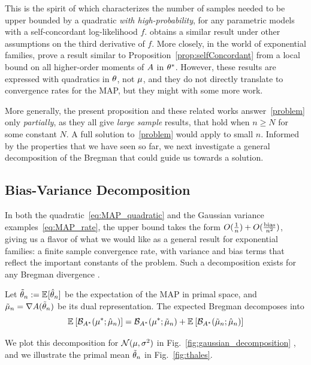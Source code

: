 This is the spirit of
\citet{ostrovskii2021finite} which characterizes the number of samples needed to be upper bounded by a quadratic \emph{with high-probability}, for any parametric models with a self-concordant log-likelihood $f$.
\citet{anastasiou2017bounds} obtains a similar result under other assumptions on the third derivative of $f$.
More closely, in the world of exponential families, \citet{kakade2010learning} prove a result similar to Proposition~\ref{prop:selfConcordant} from a local bound on all higher-order moments of $A$ in $\theta^*$.
However, these results are expressed with quadratics in $\theta$, not $\mu$, and they do not directly translate to convergence rates for the MAP, but they might with some more work.

More generally, the present proposition and these related works answer~\eqref{problem} only \emph{partially}, as they all give \textit{large sample} results, that hold when $n\geq N$ for some constant $N$. 
A full solution to~\eqref{problem} would apply to small $n$.
Informed by the properties that we have seen so far, we next investigate a general decomposition of the Bregman that could guide us towards a solution.


\subsection{Bias-Variance Decomposition}
\label{ssec:bias-variance}
In both the quadratic~\eqref{eq:MAP_quadratic} and the Gaussian variance examples~\eqref{eq:MAP_rate}, the upper bound takes the form $O(\frac{1}{n}) + O(\frac{\text{bias}}{n^2})$,
giving us a flavor of what we would like as a general result for exponential families: a finite sample convergence rate, with variance and bias terms that reflect the important constants of the problem.
Such a decomposition exists for any Bregman divergence \citep[Theorem 0.1]{pfau2013generalized}.
\begin{theorem}
	Let $\tilde \theta_n := \mathbb{E}_{} [ \hat \theta_n ] $ be the expectation of the MAP in primal space, and $\tilde {\mu}_n = \nabla A(\tilde \theta_n )$ be its dual representation. The  expected Bregman decomposes into
\begin{equation}
	\mathbb{E}_{} \left[ {\mathcal B}_{A^*}(\mu^* ; \hat {\mu}_n) \right]  = {{\mathcal B}_{A^*}(\mu^* ; \tilde {\mu}_n)}
	+ {\mathbb{E}_{} \left[ {\mathcal B}_{A^*}(\tilde {\mu}_n ; \hat {\mu}_n) \right] }
	\label{eq:bias-variance}
\end{equation}
\end{theorem}
We plot this decomposition for ${\mathcal N}(\mu, \sigma^2)$ in Fig.~\ref{fig:gaussian_decomposition} , and we illustrate the primal mean $\tilde {\theta}_n$ in  Fig.~\ref{fig:thales}.

